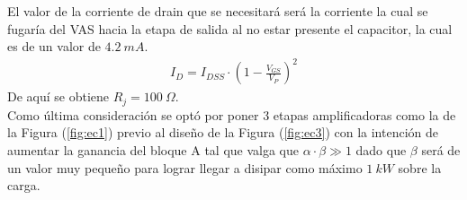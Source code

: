 El valor de la corriente de drain que se necesitará será la corriente la cual se fugaría del VAS hacia la etapa de salida al no estar presente el capacitor, la cual es de un valor de $4.2 \ mA$.
\begin{align}
I_D= I_{DSS} \cdot \left(1-\frac{V_{GS}}{V_P} \right)^2
\end{align}
De aquí se obtiene $R_j = 100 \ \Omega$.\\
Como última consideración se optó por poner 3 etapas amplificadoras como la de la Figura (\ref{fig:ec1}) previo al diseño de la Figura (\ref{fig:ec3}) con la intención de aumentar la ganancia del bloque A tal  que valga que $\alpha \cdot \beta \gg 1$ dado que $\beta$ será de un valor muy pequeño para lograr llegar a disipar como máximo $1 \ kW$ sobre la carga.


